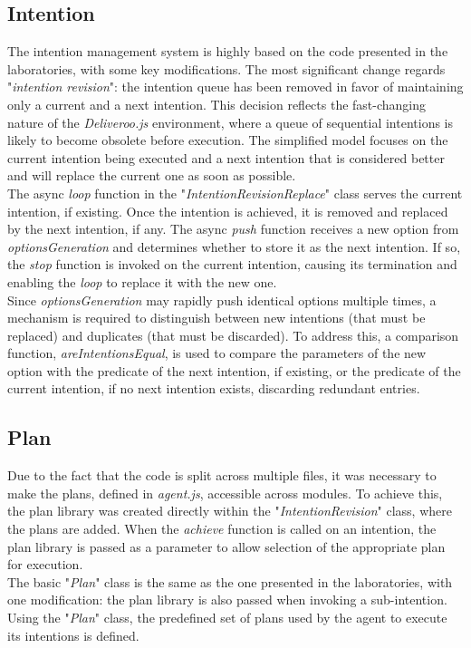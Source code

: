     \subsection{Intention}
        The intention management system is highly based on the code presented in the laboratories, with some key modifications. The most significant change regards "\textit{intention revision}": the intention queue has been removed in favor of maintaining only a current and a next intention. This decision reflects the fast-changing nature of the \textit{Deliveroo.js} environment, where a queue of sequential intentions is likely to become obsolete before execution. The simplified model focuses on the current intention being executed and a next intention that is considered better and will replace the current one as soon as possible.
        \medskip\\
        The async \textit{loop} function in the "\textit{IntentionRevisionReplace}" class serves the current intention, if existing. Once the intention is achieved, it is removed and replaced by the next intention, if any. The async \textit{push} function receives a new option from \textit{optionsGeneration} and determines whether to store it as the next intention. If so, the \textit{stop} function is invoked on the current intention, causing its termination and enabling the \textit{loop} to replace it with the new one.
        \medskip\\
        Since \textit{optionsGeneration} may rapidly push identical options multiple times, a mechanism is required to distinguish between new intentions (that must be replaced) and duplicates (that must be discarded). To address this, a comparison function, \textit{areIntentionsEqual}, is used to compare the parameters of the new option with the predicate of the next intention, if existing, or the predicate of the current intention, if no next intention exists, discarding redundant entries.

    \subsection{Plan}
        Due to the fact that the code is split across multiple files, it was necessary to make the plans, defined in \textit{agent.js}, accessible across modules. To achieve this, the plan library was created directly within the "\textit{IntentionRevision}" class, where the plans are added. When the \textit{achieve} function is called on an intention, the plan library is passed as a parameter to allow selection of the appropriate plan for execution.
        \medskip\\
        The basic "\textit{Plan}" class is the same as the one presented in the laboratories, with one modification: the plan library is also passed when invoking a sub-intention.
        \medskip\\
        Using the "\textit{Plan}" class, the predefined set of plans used by the agent to execute its intentions is defined.

